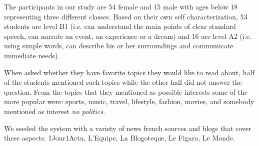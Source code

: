 The participants in our study are 54 female and 15 male with ages below 18 representing three different classes. Based on their own self characterization, 53 students are level B1 (i.e. can understand the main points of clear standard speech, can narrate an event, an experience or a dream) and 16 are level A2 (i.e. using simple words, can describe his or her surroundings and communicate immediate needs). 


When asked whether they have favorite topics they would like to read about, half of the students mentioned such topics while the other half did not answer the question. From the topics that they mentioned as possible interests some of the more popular were: sports, music, travel, lifestyle, fashion, movies, and somebody mentioned as interest {\em no politics}.

We seeded the system with a variety of news french sources and blogs that cover these aspects: 1Jour1Actu, L'Equipe, La Blogoteque, Le Figaro, Le Monde. 











